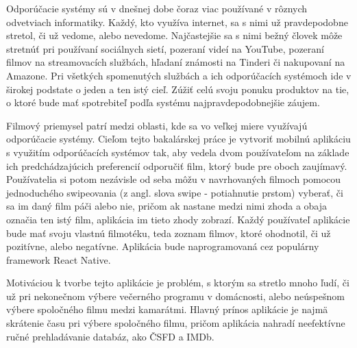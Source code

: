 
Odporúčacie systémy sú v dnešnej dobe čoraz viac používané v rôznych odvetviach informatiky. Každý, kto využíva internet, sa s nimi už pravdepodobne stretol, či už vedome, alebo nevedome. Najčastejšie sa s nimi bežný človek môže stretnúť pri používaní sociálnych sietí, pozeraní videí na YouTube, pozeraní filmov na streamovacích službách, hľadaní známosti na Tinderi či nakupovaní na Amazone. Pri všetkých spomenutých službách a ich odporúčacích systémoch ide v širokej podstate o jeden a ten istý cieľ. Zúžiť celú svoju ponuku produktov na tie, o ktoré bude mať spotrebiteľ podľa systému najpravdepodobnejšie záujem. \par
Filmový priemysel patrí medzi oblasti, kde sa vo veľkej miere využívajú odporúčacie systémy. Cieľom tejto bakalárskej práce je vytvoriť mobilnú aplikáciu s využitím odporúčacích systémov tak, aby vedela dvom používateľom na základe ich predchádzajúcich preferencií odporučiť film, ktorý bude pre oboch zaujímavý. Používatelia si potom nezávisle od seba môžu v navrhovaných filmoch pomocou jednoduchého swipeovania (z angl. slova swipe - potiahnutie prstom) vyberať, či sa im daný film páči alebo nie, pričom ak nastane medzi nimi zhoda a obaja označia ten istý film, aplikácia im tieto zhody zobrazí. Každý používateľ aplikácie bude mať svoju vlastnú filmotéku, teda zoznam filmov, ktoré ohodnotil, či už pozitívne, alebo negatívne. Aplikácia bude naprogramovaná cez populárny framework React Native. \par
Motiváciou k tvorbe tejto aplikácie je problém, s ktorým sa stretlo mnoho ľudí, či už pri nekonečnom výbere večerného programu v domácnosti, alebo neúspešnom výbere spoločného filmu medzi kamarátmi. Hlavný prínos aplikácie je najmä skrátenie času pri výbere spoločného filmu, pričom aplikácia nahradí neefektívne ručné prehladávanie databáz, ako ČSFD a IMDb. \par
